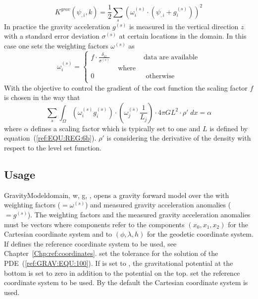 \begin{equation}\label{ref:GRAV:EQU:10}
K^{grav}(\psi_{,i},k) = \frac{1}{2}\sum_{s} ( \omega^{(s)}_i \cdot (\psi_{,i}+ g^{(s)}_i) ) ^2
\end{equation} 
In practice the gravity acceleration $g^{(s)}$ is measured in the vertical
direction $z$ with a standard error deviation $\sigma^{(s)}$ at certain
locations in the domain.
In this case one sets the weighting factors $\omega^{(s)}$ as
\begin{equation}\label{ref:GRAV:EQU:11}
\omega^{(s)}_i 
= \left\{
\begin{array}{lcl}
f \cdot  \frac{\delta_{iz}}{\sigma^{(s)}} & & \mbox{data are available} \\
& \mbox{ where } & \\
0 & & \mbox{ otherwise } \\
\end{array}
\right.
\end{equation} 
With the objective to control the 
gradient of the cost function 
the scaling factor $f$ is chosen in the way that
\begin{equation}\label{ref:GRAV:EQU:12}
\sum_{s} \int_{\Omega} ( \omega^{(s)}_i g^{(s)}_i ) \cdot ( \omega^{(s)}_j \frac{1}{L_j} ) \cdot 4\pi G L^2 \cdot \rho' \;  dx =\alpha
\end{equation} 
where $\alpha$ defines a scaling factor which is typically set to one and $L$ is defined by equation~(\ref{ref:EQU:REG:6b}). $\rho'$ is considering the 
derivative of the density with respect to the level set function. 


\subsection{Usage}

\begin{classdesc}{GravityModel}{domain, 
w, g,
,
}
opens a gravity forward model over the \Domain {} with 
weighting factors  ($=\omega^{(s)}$) and measured gravity acceleration anomalies  ($=g^{(s)}$).
The weighting factors and the  measured gravity acceleration anomalies must be vectors
where components refer to the components 
$(x_0,x_1,x_2)$ for the Cartesian coordinate system 
and to $(\phi, \lambda, h)$ for the geodetic coordinate system. 
If  defines the reference coordinate system to be used, see Chapter~\ref{Chp:ref:coordinates}.
 set the tolerance for the solution of the PDE~(\ref{ref:GRAV:EQU:100}).
If  is set to  \True, the gravitational potential 
at the bottom is set to zero in addition to the potential on the top. 
 set the reference coordinate system to be used. By the default the 
Cartesian coordinate system is used.
\end{classdesc}


